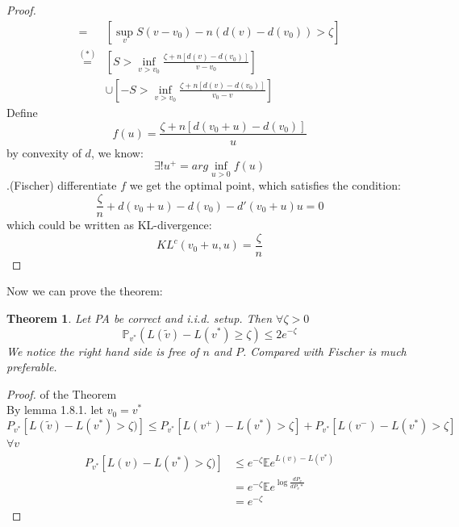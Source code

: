 \documentclass[a4paper,12pt, oneside, fleqn]{book}
\newtheorem{theorem}{Theorem}[section]
\theoremstyle{definition}
\theoremstyle{remark}
\begin{document}
\begin{proof}
\begin{align*}
	[ L(\tilde{v}) - L(v^*)>\zeta)] =& [\sup_v S(v - v_0) - n(d(v) - d(v_0)) > \zeta]\\
	\overset{(*)}{=}& [S > \inf_{v > v_0} \frac{\zeta + n[d(v) - d(v_0)]}{v - v_0}] \\
	&\cup [-S > \inf_{v > v_0} \frac{\zeta + n[d(v) - d(v_0)]}{v_0 - v}]
\end{align*}
	Define
	\begin{equation*}
		f(u) = \frac{\zeta + n[d(v_0 + u) - d(v_0)]}{u}
	\end{equation*}
	by convexity of $d$, we know:
	\begin{equation*}
		\exists! u^+ = arg\inf_{u > 0} f(u)
	\end{equation*} .(Fischer)
	differentiate $f$ we get the optimal point, which satisfies the condition:
	\begin{equation*}
		\frac{\zeta}{n} + d(v_0 + u) - d(v_0) - d'(v_0 + u)u = 0
	\end{equation*} which could be written as KL-divergence:
	\begin{equation*}
		KL^c (v_0 + u, u) = \frac{\zeta}{n}
	\end{equation*}
\end{proof}

Now we can prove the theorem:
\begin{theorem}
	Let PA be correct and i.i.d. setup. Then $\forall \zeta >0$
	\begin{equation*}
		\mathbb{P}_{v^*} (L(\tilde{v}) - L(v^*) \geq \zeta) \leq 2 e^{-\zeta}
	\end{equation*}
	We notice the right hand side is free of $n$ and $P$. Compared with Fischer is much preferable.
\end{theorem}



\begin{proof} of the Theorem\\
By lemma 1.8.1.
let $v_0 = v^*$
\begin{equation*}
	P_{v^*} [ L(\tilde{v}) - L(v^*)>\zeta)] \leq P_{v^*} [L(v^+) - L(v^*)>\zeta] + P_{v^*}[L(v^-) - L(v^*)>\zeta]
\end{equation*}
$\forall v$
\begin{align*}
	P_{v^*} [ L(v) - L(v^*)>\zeta)] &\leq e^{-\zeta} \mathbb{E} e^{L(v) - L(v^*)}\\
	&= e^{-\zeta} \mathbb{E} e^{\log \frac{dP_v}{dP_v*}}\\
	&= e^{-\zeta}
\end{align*}

	
\end{proof}
\end{document}
